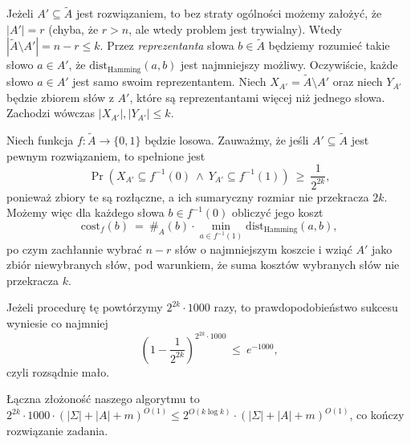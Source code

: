 \documentclass[12pt]{article}
\begin{document}
	\medskip
	
	Jeżeli \(A' \subseteq \tilde{A}\) jest rozwiązaniem, to bez straty ogólności
	możemy założyć, że \(|A'| = r\) (chyba, że \(r > n\), ale wtedy problem jest
	trywialny). Wtedy \(|\tilde{A} \setminus A'| = n - r \leqslant k\). Przez
	\textit{reprezentanta} słowa \(b \in \tilde{A}\) będziemy rozumieć takie
	słowo \(a \in A'\), że \(\text{dist}_{\text{Hamming}} (a, b)\) jest
	najmniejszy możliwy. Oczywiście, każde słowo \(a \in A'\) jest samo swoim
	reprezentantem. Niech \(X_{A'} = \tilde{A} \setminus A'\) oraz niech
	\(Y_{A'}\) będzie zbiorem słów z \(A'\), które są reprezentantami więcej niż
	jednego słowa. Zachodzi wówczas \(|X_{A'}|, |Y_{A'}| \leqslant k\).
	
	\medskip
	
	Niech funkcja \(f : \tilde{A} \to \{0, 1\}\) będzie losowa. Zauważmy, że
	jeśli \(A' \subseteq \tilde{A}\) jest pewnym rozwiązaniem, to spełnione jest
	\[ \Pr \left( X_{A'} \subseteq f^{-1}(0) \ \wedge \ Y_{A'} \subseteq
	f^{-1}(1) \right) \ \geqslant \ \frac{1}{2^{2k}} \text{,} \]
	ponieważ zbiory te są rozłączne, a ich sumaryczny rozmiar nie przekracza
	\(2k\). Możemy więc dla każdego słowa \(b \in f^{-1}(0)\) obliczyć jego
	koszt
	\[ \text{cost}_{f} (b) \ = \ \#_{A}(b) \cdot \min_{a \in f^{-1}(1)}
	\text{dist}_{\text{Hamming}} (a, b) \text{,} \]
	po czym zachłannie wybrać \(n - r\) słów o najmniejszym koszcie i wziąć
	\(A'\) jako zbiór niewybranych słów, pod warunkiem, że suma kosztów
	wybranych słów nie przekracza \(k\).
	
	\medskip
	
	Jeżeli procedurę tę powtórzymy \(2^{2k} \cdot 1000\) razy, to
	prawdopodobieństwo sukcesu wyniesie co najmniej
	\[ \left( 1 - \frac{1}{2^{2k}} \right) ^ {2^{2k} \cdot 1000} \ \leqslant \
	e^{-1000} \text{,} \]
	czyli rozsądnie mało.
	
	\medskip
	
	Łączna złożoność naszego algorytmu to \(2^{2k} \cdot 1000 \cdot (|\Sigma| +
	|A| + m) ^ {O(1)} \leqslant 2^{O(k \log k)} \cdot (|\Sigma| + |A| + m) ^
	{O(1)}\), co kończy rozwiązanie zadania.
\end{document}
